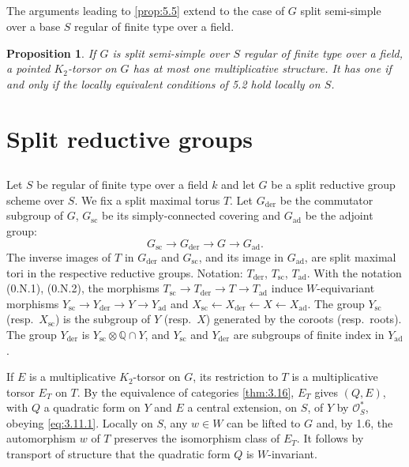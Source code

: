 \documentclass[11pt,a4paper]{article}
\theoremstyle{plain}
\newtheorem{proposition}[theorem]{Proposition}
\theoremstyle{definition}
\newcommand{\cO}{\mathcal{O}}
\newcommand{\bQ}{\mathbb{Q}}
\newcommand{\der}{\mathrm{der}}
\newcommand{\scu}{\mathrm{sc}}
\newcommand{\ad}{\mathrm{ad}}
\begin{document}
\subsection{}
The arguments leading to \ref{prop:5.5} extend to the case of $G$ split semi-simple over a base $S$ regular of finite type over a field.

\begin{proposition}\label{prop:5.7}
If $G$ is split semi-simple over $S$ regular of finite type over a field, a pointed $K_2$-torsor on $G$ has at most one multiplicative structure. It has one if and only if the locally equivalent conditions of 5.2 hold locally on $S$.
\end{proposition}

\section{Split reductive groups}

\subsection{}
Let $S$ be regular of finite type over a field $k$ and let $G$ be a split reductive group scheme over $S$. We fix a split maximal torus $T$. Let $G_\der$ be the commutator subgroup of $G$, $G_\scu$ be its simply-connected covering and $G_\ad$ be the adjoint group:
\[G_\scu \to G_\der \to G \to G_\ad.\]
The inverse images of $T$ in $G_\der$ and $G_\scu$, and its image in $G_\ad$, are split maximal tori in the respective reductive groups. Notation: $T_\der$, $T_\scu$, $T_\ad$. With the notation (0.N.1), (0.N.2), the morphisms $T_\scu \to T_\der \to T \to T_\ad$ induce $W$-equivariant morphisms $Y_\scu \to Y_\der \to Y \to Y_\ad$ and $X_\scu \leftarrow X_\der \leftarrow X \leftarrow X_\ad$. The group $Y_\scu$ (resp.~$X_\scu$) is the subgroup of $Y$ (resp.~$X$) generated by the coroots (resp.~roots). The group $Y_\der$ is $Y_\scu \otimes \bQ \cap Y$, and $Y_\scu$ and $Y_\der$ are subgroups of finite index in $Y_\ad$.

If $E$ is a multiplicative $K_2$-torsor on $G$, its restriction to $T$ is a multiplicative torsor $E_T$ on $T$. By the equivalence of categories \ref{thm:3.16}, $E_T$ gives $(Q, E)$, with $Q$ a quadratic form on $Y$ and $E$ a central extension, on $S$, of $Y$ by $\cO^*_S$, obeying \eqref{eq:3.11.1}. Locally on $S$, any $w \in W$ can be lifted to $G$ and, by 1.6, the automorphism $w$ of $T$ preserves the isomorphism class of $E_T$. It follows by transport of structure that the quadratic form $Q$ is $W$-invariant.
\end{document}
